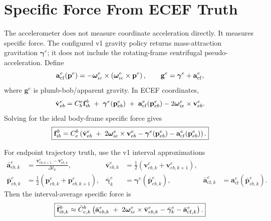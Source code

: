 \section{Specific Force From ECEF Truth}

The accelerometer does not measure coordinate acceleration directly. It measures
specific force. The configured v1 gravity policy returns mass-attraction
gravitation $\boldsymbol{\gamma}^{e}$; it does not include the rotating-frame
centrifugal pseudo-acceleration. Define
\begin{equation}
\mathbf{a}_{\mathrm{cf}}^{e}(\mathbf{p}^{e})
=
-\boldsymbol{\omega}_{ie}^{e}\times
\left(\boldsymbol{\omega}_{ie}^{e}\times\mathbf{p}^{e}\right),
\qquad
\mathbf{g}^{e}
=
\boldsymbol{\gamma}^{e}+\mathbf{a}_{\mathrm{cf}}^{e},
\label{eq:imu_apparent_gravity_definition}
\end{equation}
where $\mathbf{g}^{e}$ is plumb-bob/apparent gravity. In ECEF coordinates,
\begin{equation}
\dot{\mathbf{v}}_{eb}^{e}
=
C_b^e\mathbf{f}_{ib}^{b}
\;+\;
\boldsymbol{\gamma}^{e}(\mathbf{p}_{eb}^{e})
\;+\;
\mathbf{a}_{\mathrm{cf}}^{e}(\mathbf{p}_{eb}^{e})
-
2\boldsymbol{\omega}_{ie}^{e}\times\mathbf{v}_{eb}^{e}.
\end{equation}
Solving for the ideal body-frame specific force gives
\begin{equation}
\boxed{
\mathbf{f}_{ib}^{b}
=
C_e^b
\left(
\dot{\mathbf{v}}_{eb}^{e}
\;+\;
2\boldsymbol{\omega}_{ie}^{e}\times\mathbf{v}_{eb}^{e}
-
\boldsymbol{\gamma}^{e}(\mathbf{p}_{eb}^{e})
-
\mathbf{a}_{\mathrm{cf}}^{e}(\mathbf{p}_{eb}^{e})
\right).
}
\label{eq:imu_truth_specific_force_from_ecef}
\end{equation}

For endpoint trajectory truth, use the v1 interval approximations
\begin{align}
\bar{\mathbf{a}}_{eb,k}^{e}
&=
\frac{\mathbf{v}_{eb,k+1}^{e}-\mathbf{v}_{eb,k}^{e}}{\Delta t_k},
&
\bar{\mathbf{v}}_{eb,k}^{e}
&=
\frac{1}{2}
\left(
\mathbf{v}_{eb,k}^{e}
+\mathbf{v}_{eb,k+1}^{e}
\right),\\
\bar{\mathbf{p}}_{eb,k}^{e}
&=
\frac{1}{2}
\left(
\mathbf{p}_{eb,k}^{e}
+\mathbf{p}_{eb,k+1}^{e}
\right),
&
\bar{\boldsymbol{\gamma}}_{k}^{e}
&=
\boldsymbol{\gamma}^{e}(\bar{\mathbf{p}}_{eb,k}^{e}),
&
\bar{\mathbf{a}}_{\mathrm{cf},k}^{e}
&=
\mathbf{a}_{\mathrm{cf}}^{e}(\bar{\mathbf{p}}_{eb,k}^{e}).
\end{align}
Then the interval-average specific force is
\begin{equation}
\boxed{
\bar{\mathbf{f}}_{ib,k}^{b}
\approx
\bar{C}_{e,k}^{b}
\left(
\bar{\mathbf{a}}_{eb,k}^{e}
\;+\;
2\boldsymbol{\omega}_{ie}^{e}\times\bar{\mathbf{v}}_{eb,k}^{e}
-
\bar{\boldsymbol{\gamma}}_{k}^{e}
-
\bar{\mathbf{a}}_{\mathrm{cf},k}^{e}
\right).
}
\label{eq:imu_average_specific_force_from_ecef_truth}
\end{equation}

